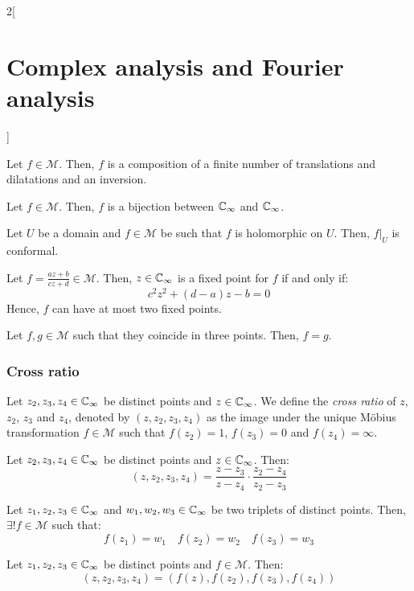 \documentclass[../../../main.tex]{subfiles}
\begin{document}
\begin{multicols}{2}[\section{Complex analysis and Fourier analysis}]
\begin{theorem}
    Let $f\in\mathcal{M}$. Then, $f$ is a composition of a finite number of translations and dilatations and an inversion.
  \end{theorem}
  \begin{proposition}
    Let $f\in\mathcal{M}$. Then, $f$ is a bijection between $\mathbb{C}_\infty$ and $\mathbb{C}_\infty$.
  \end{proposition}
  \begin{proposition}
    Let $U$ be a domain and $f\in\mathcal{M}$ be such that $f$ is holomorphic on $U$. Then, $f|_{U}$ is conformal.
  \end{proposition}
  \begin{proposition}
    Let $f=\frac{az+b}{cz+d}\in\mathcal{M}$. Then, $z\in\mathbb{C}_\infty$ is a fixed point for $f$ if and only if: $$c^2z^2+(d-a)z-b=0$$
    Hence, $f$ can have at most two fixed points.
  \end{proposition}
  \begin{corollary}
    Let $f,g\in\mathcal{M}$ such that they coincide in three points. Then, $f=g$.
  \end{corollary}
  \subsubsection{Cross ratio}
  \begin{definition}
    Let $z_2,z_3,z_4\in\mathbb{C}_\infty$ be distinct points and $z\in\mathbb{C}_\infty$. We define the \emph{cross ratio} of $z$, $z_2$, $z_3$ and $z_4$, denoted by $(z,z_2,z_3,z_4)$ as the image under the unique Möbius transformation $f\in\mathcal{M}$ such that $f(z_2)=1$, $f(z_3)=0$ and $f(z_4)=\infty$.
  \end{definition}
  \begin{proposition}
    Let $z_2,z_3,z_4\in\mathbb{C}_\infty$ be distinct points and $z\in\mathbb{C}_\infty$. Then: $$(z,z_2,z_3,z_4)=\frac{z-z_3}{z-z_4}\cdot\frac{z_2-z_4}{z_2-z_3}$$
  \end{proposition}
  \begin{corollary}
    Let $z_1,z_2,z_3\in\mathbb{C}_\infty$ and $w_1,w_2,w_3\in\mathbb{C}_\infty$ be two triplets of distinct points. Then, $\exists! f\in\mathcal{M}$ such that: $$f(z_1)=w_1\quad f(z_2)=w_2\quad f(z_3)=w_3$$
  \end{corollary}
  \begin{theorem}
    Let $z_1,z_2,z_3\in\mathbb{C}_\infty$ be distinct points and $f\in\mathcal{M}$. Then: $$(z,z_2,z_3,z_4)=(f(z),f(z_2),f(z_3),f(z_4))$$
  \end{theorem}

\end{multicols}
\end{document}
